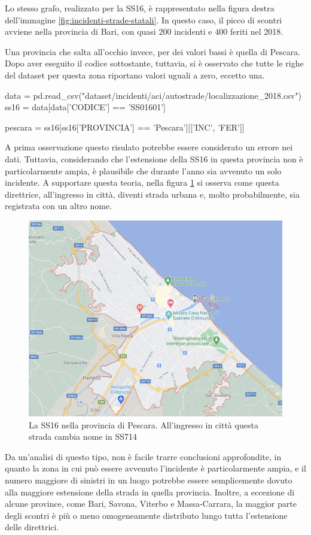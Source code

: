 \documentclass[a4paper,12pt]{report}
\begin{document}
Lo stesso grafo, realizzato per la SS16, è rappresentato nella figura destra dell'immagine 
\ref{fig:incidenti-strade-statali}. 
In questo caso, il picco di scontri avviene nella provincia 
di Bari, con quasi $200$ incidenti e $400$ feriti nel 2018. 

Una provincia che salta all'occhio invece, per dei valori bassi è quella di Pescara. 
Dopo aver eseguito il codice sottostante, tuttavia, si è osservato che tutte le righe 
del dataset per questa zona riportano valori uguali a zero, eccetto una. 

\begin{code}
data = pd.read_csv("dataset/incidenti/aci/autostrade/localizzazione_2018.csv")
ss16 = data[data['CODICE'] == 'SS01601']

pescara = ss16[ss16['PROVINCIA'] == 'Pescara'][['INC', 'FER']]
\end{code}

A prima osservazione questo risulato potrebbe essere considerato un errore nei dati. 
Tuttavia, considerando che l'estensione della SS16 in questa provincia non 
è particolarmente ampia, è plausibile che durante l'anno sia avvenuto un solo incidente. 
A supportare questa teoria, nella figura \ref{fig:ss16-pescara} si osserva come 
questa direttrice, all'ingresso in città, diventi strada urbana e, molto probabilmente, 
sia registrata con un altro nome.

\begin{figure}
    \hfill\includegraphics[width=0.5\linewidth]{img/pescara_ss16.png}\hspace*{\fill}
    \caption{La SS16 nella provincia di Pescara. All'ingresso in città questa strada cambia nome in SS714}
    \label{fig:ss16-pescara}
\end{figure}

Da un'analisi di questo tipo, non è facile trarre conclusioni approfondite, in quanto la 
zona in cui può essere avvenuto l'incidente è particolarmente ampia, e il numero maggiore di 
sinistri in un luogo potrebbe essere semplicemente dovuto alla maggiore estensione della 
strada in quella provincia. 
Inoltre, a eccezione di alcune province, come Bari, Savona, Viterbo e Massa-Carrara, 
la maggior parte degli scontri è più o meno omogeneamente distributo lungo tutta 
l'estensione delle direttrici. 
\end{document}
